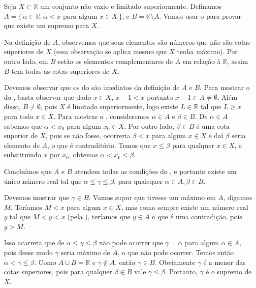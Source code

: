 \documentclass[../main.tex]{subfiles}
\begin{document}
\begin{dem}
    Seja $X \subset \mathbb{R}$ um conjunto não vazio e limitado superiormente. 
    Definamos $A = \{\, \alpha \in \mathbb{R} : \alpha < x \text{ para algum } x \in X \,\}$, e $B = \mathbb{R} \setminus A$.
    Vamos usar o  para provar que existe um supremo para $X$.

    Na definição de $A$, observemos que seus elementos são números que não são cotas superiores de $X$ (essa observação se aplica mesmo que $X$ tenha máximo). Por outro lado, em $B$ estão os elementos complementares de $A$ em relação à $\mathbb{R}$, assim $B$ tem todas as cotas superiores de $X$.

    Devemos observar que os  do  são imediatos da definição de $A$ e $B$.
    Para mostrar o  do , basta observar que dado $x \in X$, $x-1 < x$ portanto $x-1 \in A \neq \emptyset$.
    Além disso, $B \neq \emptyset$, pois $X$ é limitado superiormente, logo existe $L \in \mathbb{R}$ tal que $L \geq x$ para todo $x \in X$.
    Para mostrar o , consideremos $\alpha \in A$ e $\beta \in B$. De $\alpha \in A$ sabemos que $\alpha < x_0$ para algum $x_0 \in X$. Por outro lado, $\beta \in B$ é uma cota superior de $X$, pois se não fosse, ocorreria $\beta < x$ para algum $x \in X$ e daí $\beta$ seria elemento de $A$, o que é contraditório. Temos que $x \leq \beta$ para qualquer $x \in X$, e substituindo $x$ por $x_0$, obtemos $\alpha < x_0 \leq \beta$.

    Concluímos que $A$ e $B$ atendem todas as condições do , e portanto existe um único número real tal que 
    $\alpha \leq \gamma \leq \beta$, para quaisquer $\alpha \in A, \beta \in B$.

    Devemos mostrar que $\gamma \in B$. Vamos supor que tivesse um máximo em $A$, digamos $M$. Teríamos $M < x$ para algum $x \in X$, mas como sempre existe um número real $y$ tal que $M < y < x$ (pela ), teríamos que $y \in A$ o que é uma contradição, pois $y > M$.

    Isso acarreta que de $\alpha \leq \gamma \leq \beta$ não pode ocorrer que $\gamma = \alpha$ para algum $\alpha \in A$, pois desse modo $\gamma$ seria máximo de $A$, o que não pode ocorrer. Temos então $\alpha < \gamma \leq \beta$. Como $A \cup B = \mathbb{R}$ e $\gamma \not\in A$, então 
    $\gamma \in B$. Obviamente $\gamma$ é a menor das cotas superiores, pois para qualquer $\beta \in B$ vale $\gamma \leq \beta$. Portanto, $\gamma$ é o supremo de $X$.
\end{dem}
\end{document}
